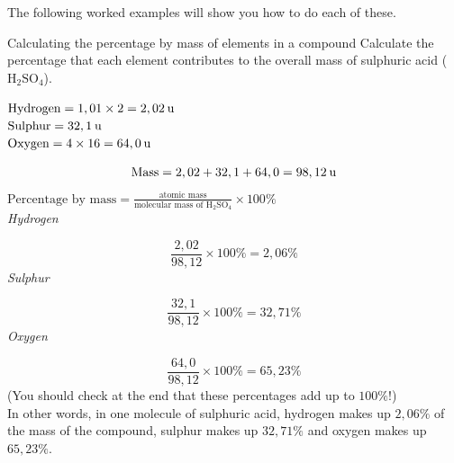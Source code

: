 The following worked examples will show you how to do each of these.
\par
            \label{m38712*secfhsst!!!underscore!!!id901}
      \noindent
      \begin{wex}{Calculating the percentage by mass of elements in a compound }
{
      \label{m38712*probfhsst!!!underscore!!!id902}
      \label{m38712*id280520}Calculate the percentage that each element contributes to the overall mass of sulphuric acid (${\text{H}}_{2}{\text{SO}}_{4}$).
      }
{
      \label{m38712*id280575}$\text{Hydrogen}=1,01\ensuremath{\times}2=2,02\phantom{\rule{2pt}{0ex}}\text{u}$ \\ 
      \label{m38712*id280588}$\text{Sulphur}=32,1\phantom{\rule{2pt}{0ex}}\text{u}$ \\
      \label{m38712*id280591}$\text{Oxygen}=4\ensuremath{\times}16=64,0\phantom{\rule{2pt}{0ex}}\text{u}$
      \label{m38712*id280629}\nopagebreak\noindent{}
        
    \begin{equation*}
    \text{Mass}=2,02 + 32,1 + 64,0 =98,12\phantom{\rule{2pt}{0ex}}\text{u}
      \end{equation*}
      \label{m38712*id280688}$\text{Percentage by mass}=\frac{\text{atomic mass}}{\text{molecular mass of H}{}_{2}\text{SO}{}_{4}}\ensuremath{\times}100\%$ \\
      \label{m38712*id280729}
        \textsl{Hydrogen}
      
      \label{m38712*id280735}\nopagebreak\noindent{}
        
    \begin{equation*}
    \frac{2,02}{98,12}\ensuremath{\times}100\%=2,06\%
      \end{equation*}
      \label{m38712*id280780}
        \textsl{Sulphur}
      
      \label{m38712*id280786}\nopagebreak\noindent{}
        
    \begin{equation*}
    \frac{32,1}{98,12}\ensuremath{\times}100\%=32,71\%
      \end{equation*}
      \label{m38712*id280831}
        \textsl{Oxygen}
      
      \label{m38712*id280837}\nopagebreak\noindent{}
        
    \begin{equation*}
    \frac{64,0}{98,12}\ensuremath{\times}100\%=65,23\%
      \end{equation*}
      \label{m38712*id280876}(You should check at the end that these percentages add up to $100\%$!) \\
      \label{m38712*id280880}In other words, in one molecule of sulphuric acid, hydrogen makes up $2,06\%$ of the mass of the compound, sulphur makes up $32,71\%$ and oxygen makes up $65,23\%$. 
}
    \end{wex}
